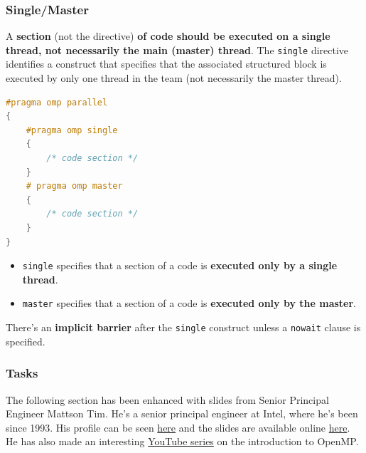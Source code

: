 \newpage

\subsubsection{Single/Master}

A \textbf{section} (not the directive) \textbf{of code should be executed on a single thread, not necessarily the main (master) thread}. The \texttt{single} directive identifies a construct that specifies that the associated structured block is executed by only one thread in the team (not necessarily the master thread).

\begin{openmpbox}
\begin{lstlisting}[language=C++]
#pragma omp parallel
{
    #pragma omp single
    {
        /* code section */
    }
    # pragma omp master
    {
        /* code section */
    }
}\end{lstlisting}
\end{openmpbox}

\begin{itemize}
    \item \texttt{single} specifies that a section of a code is \textbf{executed only by a single thread}.

    \item \texttt{master} specifies that a section of a code is \textbf{executed only by the master}.
\end{itemize}

\noindent
There's an \textbf{implicit barrier} after the \texttt{single} construct unless a \texttt{nowait} clause is specified.

\newpage

\subsubsection{Tasks}

The following section has been enhanced with slides from Senior Principal Engineer Mattson Tim. He's a senior principal engineer at Intel, where he's been since 1993. His profile can be seen \href{https://www.intel.com/content/www/us/en/research/featured-researchers/tim-mattson.html}{here} and the slides are available online \href{https://www.openmp.org/wp-content/uploads/Intro_To_OpenMP_Mattson.pdf}{here}. He has also made an interesting \href{https://youtube.com/playlist?list=PLLX-Q6B8xqZ8n8bwjGdzBJ25X2utwnoEG&si=OBjyY4AI4zWfA-vB}{YouTube series} on the introduction to OpenMP.

